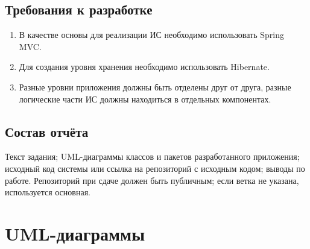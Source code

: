 \documentclass[14pt,a4paper]{extarticle}
\begin{document}
\subsection*{Требования к разработке}
\begin{enumerate}
\item В качестве основы для реализации ИС необходимо использовать Spring MVC.
\item Для создания уровня хранения необходимо использовать Hibernate.
\item Разные уровни приложения должны быть отделены друг от друга, разные логические части ИС должны находиться в отдельных компонентах.
\end{enumerate}

\subsection*{Состав отчёта}
Текст задания; UML-диаграммы классов и пакетов разработанного приложения; исходный код системы или ссылка на репозиторий с исходным кодом; выводы по работе. Репозиторий при сдаче должен быть публичным; если ветка не указана, используется основная.

\clearpage
\section{UML-диаграммы}
\end{document}
